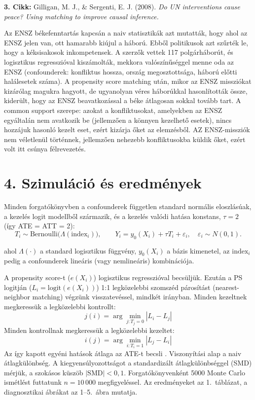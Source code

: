 \documentclass[11pt,a4paper]{article}
\begin{document}
\textbf{3. Cikk:} Gilligan, M. J., \& Sergenti, E. J. (2008). \emph{Do UN interventions cause peace? Using
matching to improve causal inference.}

Az ENSZ békefenntartás kapcsán a naiv statisztikák azt mutatták, hogy ahol az ENSZ jelen van, ott
hamarabb kiújul a háború. Ebből politikusok azt szűrték le, hogy a kéksisakosok inkompetensek. A
szerzők vettek 117 polgárháborút, és logisztikus regresszióval kiszámolták, mekkora valószínűséggel
menne oda az ENSZ (confounderek: konfliktus hossza, ország megosztottsága, háború előtti
halálesetek száma). A propensity score matching után, mikor az ENSZ missziókat kizárólag
magukra hagyott, de ugyanolyan véres háborúkkal hasonlították össze, kiderült, hogy az ENSZ
beavatkozással a béke átlagosan sokkal tovább tart. A common support szerepe: azokat a konfliktusokat, amelyekben az ENSZ egyáltalán nem avatkozik be (jellemzően a könnyen kezelhető esetek), nincs hozzájuk hasonló kezelt eset, ezért kizárja őket az elemzésből. AZ ENSZ-missziók nem véletlenül történnek, jellemzően nehezebb konfliktusokba küldik őket, ezért volt itt csúnya félrevezetés.

\section*{4. Szimuláció és eredmények}
Minden forgatókönyvben a confounderek független standard normális eloszlásúak, a kezelés logit modellből
származik, és a kezelés valódi hatása konstans, $\tau = 2$ (így ATE = ATT = 2):
\[
  T_i \sim \text{Bernoulli}\bigl(\Lambda(\text{index}_i)\bigr), \qquad
  Y_i = y_0(X_i) + \tau T_i + \varepsilon_i, \quad \varepsilon_i \sim N(0,1).
\]

ahol $\Lambda(\cdot)$ a standard logisztikus függvény, $y_0(X_i)$ a bázis kimenetel, az $\text{index}_i$ pedig a confounderek lineáris (vagy nemlineáris) kombinációja.

A propensity score-t ($e(X_i)$) logisztikus regresszióval becsüljük. Ezután a PS logitján ($L_i = \text{logit}(e(X_i))$) 1:1 legközelebbi szomszéd párosítást (nearest-neighbor matching) végzünk visszatevéssel, mindkét irányban.
Minden kezeltnek megkeressük a legközelebbi kontrollt: 
\[
j(i) = \arg\min_{j: T_j = 0} |L_i - L_j|
\]
Minden kontrollnak megkeressük a legközelebbi kezeltet: 
\[
i(j) = \arg\min_{i: T_i = 1} |L_j - L_i|
\]
Az így kapott egyéni hatások átlaga az ATE-t becsli
\cite{abadie2006}. Viszonyítási alap a naiv átlagkülönbség. A kiegyensúlyozottságot a standardizált
átlagkülönbséggel (SMD) mérjük, a szokásos küszöb $|\mathrm{SMD}| < 0{,}1$. Forgatókönyvenként 5000
Monte Carlo ismétlést futtatunk $n = 10\,000$ megfigyeléssel. Az eredményeket az 1.~táblázat, a
diagnosztikai ábrákat az 1--5.~ábra mutatja.
\end{document}
